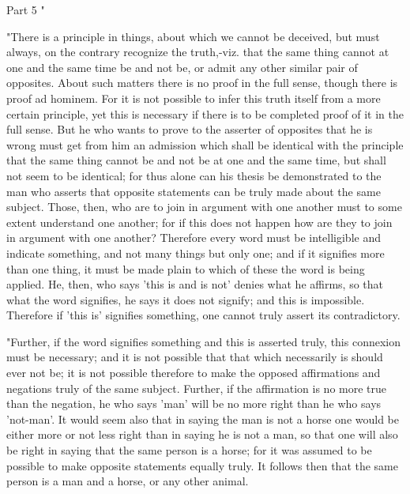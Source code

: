 Part 5 "

"There is a principle in things, about which we cannot be deceived,
but must always, on the contrary recognize the truth,-viz. that the
same thing cannot at one and the same time be and not be, or admit
any other similar pair of opposites. About such matters there is no
proof in the full sense, though there is proof ad hominem. For it
is not possible to infer this truth itself from a more certain principle,
yet this is necessary if there is to be completed proof of it in the
full sense. But he who wants to prove to the asserter of opposites
that he is wrong must get from him an admission which shall be identical
with the principle that the same thing cannot be and not be at one
and the same time, but shall not seem to be identical; for thus alone
can his thesis be demonstrated to the man who asserts that opposite
statements can be truly made about the same subject. Those, then,
who are to join in argument with one another must to some extent understand
one another; for if this does not happen how are they to join in argument
with one another? Therefore every word must be intelligible and indicate
something, and not many things but only one; and if it signifies more
than one thing, it must be made plain to which of these the word is
being applied. He, then, who says 'this is and is not' denies what
he affirms, so that what the word signifies, he says it does not signify;
and this is impossible. Therefore if 'this is' signifies something,
one cannot truly assert its contradictory. 

"Further, if the word signifies something and this is asserted truly,
this connexion must be necessary; and it is not possible that that
which necessarily is should ever not be; it is not possible therefore
to make the opposed affirmations and negations truly of the same subject.
Further, if the affirmation is no more true than the negation, he
who says 'man' will be no more right than he who says 'not-man'. It
would seem also that in saying the man is not a horse one would be
either more or not less right than in saying he is not a man, so that
one will also be right in saying that the same person is a horse;
for it was assumed to be possible to make opposite statements equally
truly. It follows then that the same person is a man and a horse,
or any other animal. 

